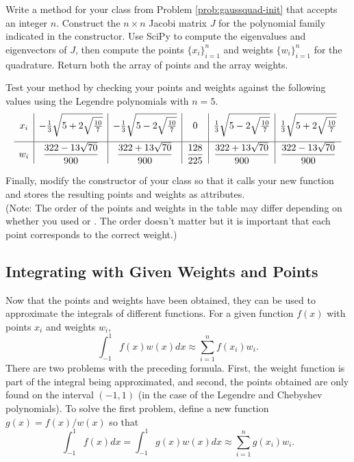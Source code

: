 
\begin{problem} %
\label{prob:jacobi}
Write a method for your class from Problem \ref{prob:gaussquad-init} that accepts an integer $n$.
Construct the $n\times n$ Jacobi matrix $J$ for the polynomial family indicated in the constructor.
Use SciPy to compute the eigenvalues and eigenvectors of $J$, then compute the points $\{x_i\}_{i=1}^n$ and weights $\{w_i\}_{i=1}^n$ for the quadrature.
Return both the array of points and the array weights.

Test your method by checking your points and weights against the following values using the Legendre polynomials with $n=5$.
{\small
\[
\centering
\begin{array}{c|c|c|c|c|c}
    x_i
    & -\frac{1}{3}\sqrt{5 + 2\sqrt{\frac{10}{7}}}
    & -\frac{1}{3}\sqrt{5 - 2\sqrt{\frac{10}{7}}}
    & 0
    & \frac{1}{3}\sqrt{5 - 2\sqrt{\frac{10}{7}}}
    & \frac{1}{3}\sqrt{5 + 2\sqrt{\frac{10}{7}}}
    \\[1em] \hline
    w_i
    & \dfrac{322-13\sqrt{70}}{900}
    & \dfrac{322+13\sqrt{70}}{900}
    & \dfrac{128}{225}
    & \dfrac{322+13\sqrt{70}}{900}
    & \dfrac{322-13\sqrt{70}}{900}
\end{array}
\]
}

Finally, modify the constructor of your class so that it calls your new function and stores the resulting points and weights as attributes.
\\(Note: The order of the points and weights in the table may differ depending on whether you used  or . The order doesn't matter but it is important that each point corresponds to the correct weight.)
\end{problem}

\subsection*{Integrating with Given Weights and Points} %

Now that the points and weights have been obtained, they can be used to approximate the integrals of different functions.
For a given function $f(x)$ with points $x_i$ and weights $w_i$,
\[
\int_{-1}^{1} f(x) w(x) dx \approx \sum_{i=1}^n f(x_i)w_i.
\]
There are two problems with the preceding formula.
First, the weight function is part of the integral being approximated, and second, the points obtained are only found on the interval $(-1,1)$ (in the case of the Legendre and Chebyshev polynomials).
To solve the first problem, define a new function $g(x) = f(x) / w(x)$ so that
\begin{equation}
\int_{-1}^{1} f(x) dx
= \int_{-1}^{1} g(x) w(x) dx
\approx \sum_{i=1}^n g(x_i)w_i.
\label{eq:quadrature-no-shift}
\end{equation}

